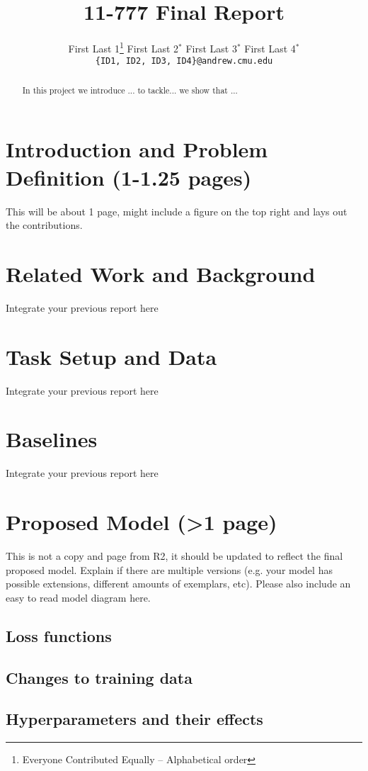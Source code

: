 \documentclass[11pt,a4paper]{article}
\title{11-777 Final Report}
\author{
  First Last 1\thanks{\hspace{4pt}Everyone Contributed Equally -- Alphabetical order} \hspace{2em} First Last 2$^*$ \hspace{2em} First Last 3$^*$ \hspace{2em} First Last 4$^*$ \\
  \texttt{\{ID1, ID2, ID3, ID4\}@andrew.cmu.edu}
  }
\date{}
\begin{document}
\maketitle
\begin{abstract}
In this project we introduce ... to tackle... we show that ...
\end{abstract}

\section{Introduction and Problem Definition (1-1.25 pages)}
This will be about 1 page, might include a figure on the top right and lays out the contributions.

\clearpage
\section{Related Work and Background}
Integrate your previous report here

\clearpage
\section{Task Setup and Data}
Integrate your previous report here

\clearpage
\section{Baselines}
Integrate your previous report here

\clearpage
\section{Proposed Model (>1 page)}
This is not a copy and page from R2, it should be updated to reflect the final proposed model. Explain if there are multiple versions (e.g. your model has possible extensions, different amounts of exemplars, etc).  Please also include an easy to read model diagram here.

\subsection{Loss functions}

\subsection{Changes to training data}

\subsection{Hyperparameters and their effects}
\end{document}
